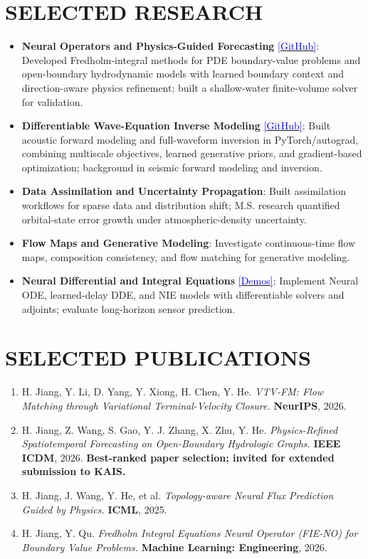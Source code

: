 \documentclass[11pt,letterpaper]{article}
\newcommand{\link}[2]{\href{#1}{\textcolor{blue}{#2}}}
\begin{document}
\section*{SELECTED RESEARCH}
\begin{itemize}
\item \textbf{Neural Operators and Physics-Guided Forecasting} \link{https://github.com/HaoyangJiang-WM/OpenBoundary}{[GitHub]}: Developed Fredholm-integral methods for PDE boundary-value problems and open-boundary hydrodynamic models with learned boundary context and direction-aware physics refinement; built a shallow-water finite-volume solver for validation.
\item \textbf{Differentiable Wave-Equation Inverse Modeling} \link{https://github.com/HaoyangJiang-WM/FWI}{[GitHub]}: Built acoustic forward modeling and full-waveform inversion in PyTorch/autograd, combining multiscale objectives, learned generative priors, and gradient-based optimization; background in seismic forward modeling and inversion.
\item \textbf{Data Assimilation and Uncertainty Propagation}: Built assimilation workflows for sparse data and distribution shift; M.S. research quantified orbital-state error growth under atmospheric-density uncertainty.
\item \textbf{Flow Maps and Generative Modeling}: Investigate continuous-time flow maps, composition consistency, and flow matching for generative modeling.
\item \textbf{Neural Differential and Integral Equations} \link{https://haoyangjiang-wm.github.io/neural-equation-demos/}{[Demos]}: Implement Neural ODE, learned-delay DDE, and NIE models with differentiable solvers and adjoints; evaluate long-horizon sensor prediction.
\end{itemize}

\section*{SELECTED PUBLICATIONS}
\begin{enumerate}
\item H. Jiang, Y. Li, D. Yang, Y. Xiong, H. Chen, Y. He. \textit{VTV-FM: Flow Matching through Variational Terminal-Velocity Closure.} \textbf{NeurIPS}, 2026.
\item H. Jiang, Z. Wang, S. Gao, Y. J. Zhang, X. Zhu, Y. He. \textit{Physics-Refined Spatiotemporal Forecasting on Open-Boundary Hydrologic Graphs.} \textbf{IEEE ICDM}, 2026. \textbf{Best-ranked paper selection; invited for extended submission to KAIS.}
\item H. Jiang, J. Wang, Y. He, et al. \textit{Topology-aware Neural Flux Prediction Guided by Physics.} \textbf{ICML}, 2025.
\item H. Jiang, Y. Qu. \textit{Fredholm Integral Equations Neural Operator (FIE-NO) for Boundary Value Problems.} \textbf{Machine Learning: Engineering}, 2026.
\end{enumerate}
\end{document}
